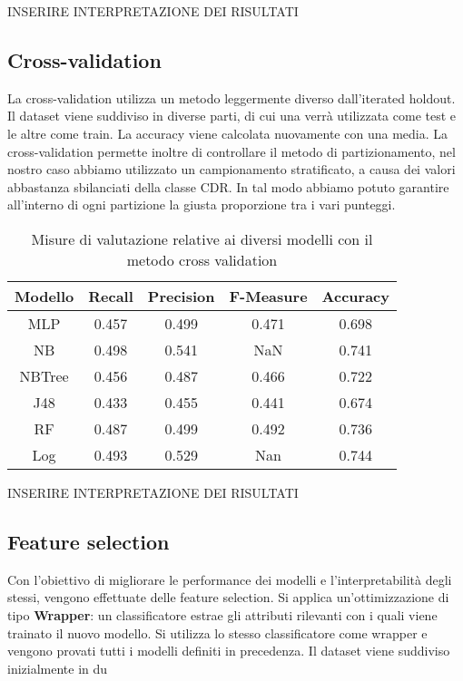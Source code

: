 INSERIRE INTERPRETAZIONE DEI RISULTATI

\subsection{Cross-validation}
La cross-validation utilizza un metodo leggermente diverso dall'iterated holdout. Il dataset viene suddiviso in diverse parti, di cui una verrà utilizzata come test e le altre come train. La accuracy viene calcolata nuovamente con una media.
La cross-validation permette inoltre di controllare il metodo di partizionamento, nel nostro caso abbiamo utilizzato un campionamento stratificato, a causa dei valori abbastanza sbilanciati della classe CDR. In tal modo abbiamo potuto garantire all'interno di ogni partizione la giusta proporzione tra i vari punteggi.

\begin{table}[H]
\tabcolsep=0.10cm
\small
\begin{tabular}{c c c c c}
     Modello & Recall & Precision & F-Measure & Accuracy  \\
     \hline
     MLP & 0.457 & 0.499 & 0.471 & 0.698 \\
     NB & 0.498 & 0.541 & NaN & 0.741 \\
     NBTree & 0.456 & 0.487 & 0.466 & 0.722 \\
     J48 & 0.433 & 0.455 & 0.441 & 0.674 \\
     RF & 0.487 & 0.499 & 0.492 & 0.736 \\
     Log & 0.493 & 0.529 & Nan & 0.744 \\
     \hline
\end{tabular}
\caption{Misure di valutazione relative ai diversi modelli con il metodo cross validation}
\end{table}

INSERIRE INTERPRETAZIONE DEI RISULTATI

\subsection{Feature selection}

Con l'obiettivo di migliorare le performance dei modelli e l'interpretabilità degli stessi, vengono effettuate delle feature selection. Si applica un'ottimizzazione di tipo \textbf{Wrapper}: un classificatore estrae gli attributi rilevanti con i quali viene trainato il nuovo modello. Si utilizza lo stesso classificatore come wrapper e vengono provati tutti i modelli definiti in precedenza. Il dataset viene suddiviso inizialmente in du



